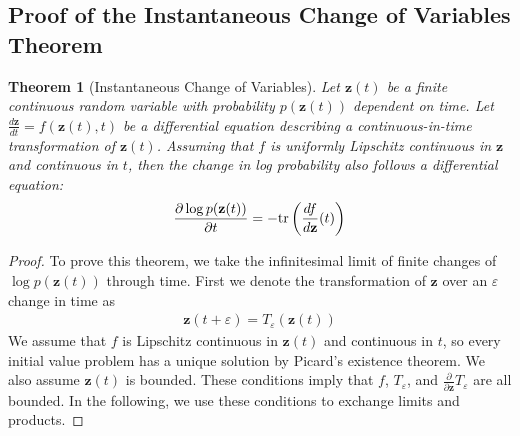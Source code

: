 \documentclass{article}
\newtheorem*{theorem*}{Theorem}
\newcommand{\tr}{\textnormal{tr}}
\renewcommand{\epsilon}{\varepsilon}
\newcommand{\vz}{\mathbf{z}}
\newcommand{\sol}{\vz}  %
\newcommand{\cnfx}{\sol}
\begin{document}

\small {}



\clearpage

\begin{appendices}

\section{Proof of the Instantaneous Change of Variables Theorem}\label{sec:proof}
\begin{theorem*}[Instantaneous Change of Variables]
Let $\cnfx(t)$ be a finite continuous random variable with probability $p(\cnfx(t))$ dependent on time.
Let $\frac{d\cnfx}{dt} = f(\cnfx(t), t)$ be a differential equation describing a continuous-in-time transformation of $\cnfx(t)$.
Assuming that $f$ is uniformly Lipschitz continuous in $\cnfx$ and continuous in $t$, then the change in log probability also follows a differential equation:
\begin{align*}
\frac{\partial \log p(\cnfx(t))}{\partial t} = -\tr\left(\frac{d f}{d \cnfx}(t)\right)
\end{align*}
\end{theorem*}
\begin{proof}
To prove this theorem, we take the infinitesimal limit of finite changes of $\log p({\cnfx}(t))$ through time.
First we denote the transformation of ${\cnfx}$ over an $\epsilon$ change in time as%
\begin{align}
{\cnfx}(t+\epsilon) = T_\epsilon({\cnfx}(t))%
\end{align}
We assume that $f$ is Lipschitz continuous in ${\cnfx}(t)$ and continuous in $t$, so every initial value problem has a unique solution by Picard's existence theorem.
We also assume ${\cnfx}(t)$ is bounded.
These conditions imply that $f$, $T_\epsilon$, and $\frac{\partial}{\partial {\cnfx}}T_\epsilon$ are all bounded.
In the following, we use these conditions to exchange limits and products.


\end{proof}
\end{appendices}
\end{document}
